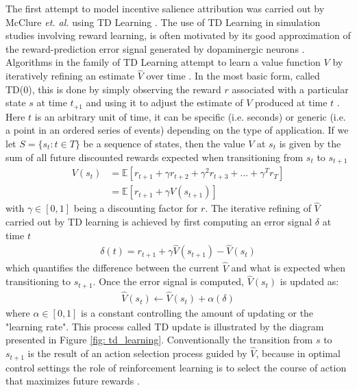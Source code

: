 The first attempt to model incentive salience attribution was carried out by McClure \textit{et. al.} using TD Learning \cite{mcclure2003computational}. The use of TD Learning in simulation studies involving reward learning, is often motivated by its good approximation of the reward-prediction error signal generated by dopaminergic neurons \cite{schultz1997neural,flagel2011selective}. Algorithms in the family of TD Learning attempt to learn a value function $V$ by iteratively refining an estimate $\widehat{V}$ over time \cite{sutton2018reinforcement}. In the most basic form, called TD(0), this is done by simply observing the reward $r$ associated with a particular state $s$ at time $t_{+1}$ and using it to adjust the estimate of $V$ produced at time $t$ \cite{sutton2018reinforcement}. Here $t$ is an arbitrary unit of time, it can be specific (i.e. seconds) or generic (i.e. a point in an ordered series of events) depending on the type of application. If we let $S=\{s_{t}: t \in T\}$ be a sequence of states, then the value $V$  at $s_{t}$ is given by the sum of all future discounted rewards expected when transitioning from $s_t$ to $s_{t+1}$
\begin{align}
\label{td_v}
    V(s_t) 
        &= \mathbb{E}[
            r_{t+1} + 
            \gamma r_{t+2} + 
            \gamma^{2} r_{t+3} +
            ... +
            \gamma^{T} r_{T}
        ]\\
        &= \mathbb{E}[
            r_{t+1} + 
            \gamma V(s_{t+1}) 
        ] \nonumber
\end{align}
with $\gamma \in [0, 1]$ being a discounting factor for $r$. The iterative refining of $\widehat{V}$ carried out by TD learning is achieved by first computing an error signal $\delta$ at time $t$
\begin{align}
    \label{td_error}
    \delta(t) = r_{t+1} + \gamma \widehat{V}(s_{t+1}) - \widehat{V}(s_{t})
\end{align}
which quantifies the difference between the current $\widehat{V}$ and what is expected when transitioning to $s_{t+1}$. Once the error signal is computed, $\widehat{V}(s_{t})$ is updated as: 
\begin{align}
    \label{td_update}
    \widehat{V}(s_t)  \leftarrow \widehat{V}(s_t) + \alpha(\delta)
\end{align}
where $\alpha \in [0, 1]$ is a constant controlling the amount of updating or the "learning rate". This process called TD update is illustrated by the diagram presented in Figure \ref{fig: td_learning}. Conventionally the transition from $s$ to $s_{t+1}$ is the result of an action selection process guided by $\widehat{V}$, because in optimal control settings the role of reinforcement learning is to select the course of action that maximizes future rewards \cite{schultz1997neural,mcclure2003computational,sutton2018reinforcement}.
